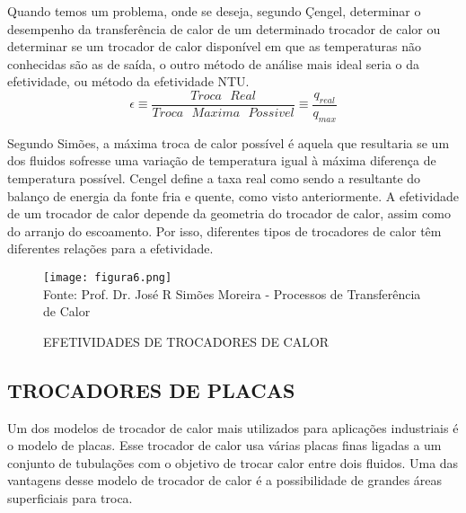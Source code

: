 \documentclass[a4paper,12pt,oneside]{article}
\begin{document}
\begin{flushright}
Quando temos um problema, onde se deseja, segundo Çengel, determinar o desempenho da transferência de calor de um determinado trocador de calor ou determinar se um trocador de calor disponível em que as temperaturas não conhecidas são as de saída, o outro método de análise mais ideal seria o da efetividade, ou método da efetividade NTU.\\

 \begin{equation}\label{eq23}
\epsilon \equiv \frac{Troca\,\,\,\,Real}{Troca\,\,\,\,Maxima\,\,\,\,Possivel} \equiv \frac{q_{real}}{q_{max}}
\end{equation}
\vspace{0.5cm}

Segundo Simões, a máxima troca de calor possível é aquela que resultaria se um dos fluidos sofresse uma variação de temperatura igual à máxima diferença de temperatura possível. Cengel define a taxa real como sendo a resultante do balanço de energia da fonte fria e quente, como visto anteriormente. A efetividade de um trocador de calor depende da geometria do trocador de calor, assim como do arranjo do escoamento. Por isso, diferentes tipos de trocadores de calor têm diferentes relações para a efetividade.  
\pagebreak
\clearpage
\newpage 

\begin{figure}[h]
	\centering
	\caption{EFETIVIDADES DE TROCADORES DE CALOR}
	\vspace{0.5cm}
	\texttt{[image: figura6.png]}
	\vspace{0.5cm}\\
	Fonte: Prof. Dr. José R Simões Moreira  - Processos de Transferência de Calor
\end{figure}
\vspace{0.5cm}

\pagebreak
\clearpage
\newpage


\subsection{\large TROCADORES DE PLACAS}
\vspace{0.5cm}

Um dos modelos de trocador de calor mais utilizados para aplicações industriais é o modelo de placas. Esse trocador de calor usa várias placas finas ligadas a um conjunto de tubulações com o objetivo de trocar calor entre dois fluidos. Uma das vantagens desse modelo de trocador de calor é a possibilidade de grandes áreas superficiais para troca.\\


\end{flushright}
\end{document}
